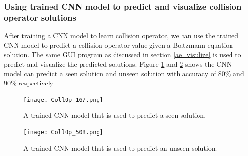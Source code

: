 \documentclass{article}
\begin{document}
\subsubsection{Using trained CNN model to predict and visualize collision operator solutions}
After training a CNN model to learn collision operator, we can use the trained CNN model to predict a collision operator value given a Boltzmann equation solution. The same GUI program as discussed in section \ref{ae_visulize} is used to predict and visualize the predicted solutions. Figure \ref{fig:CollOp_167} and \ref{fig:CollOp_508} shows the CNN model can predict a seen solution and unseen solution with accuracy of 80\% and 90\% respectively.

\begin{figure}[h]
	\centering
	\texttt{[image: CollOp\_167.png]}
	\caption{A trained CNN model that is used to predict a seen solution.}
	\label{fig:CollOp_167}
\end{figure}

\begin{figure}[h]
	\centering
	\texttt{[image: CollOp\_508.png]}
	\caption{A trained CNN model that is used to predict an unseen solution.}
	\label{fig:CollOp_508}
\end{figure}
\end{document}
